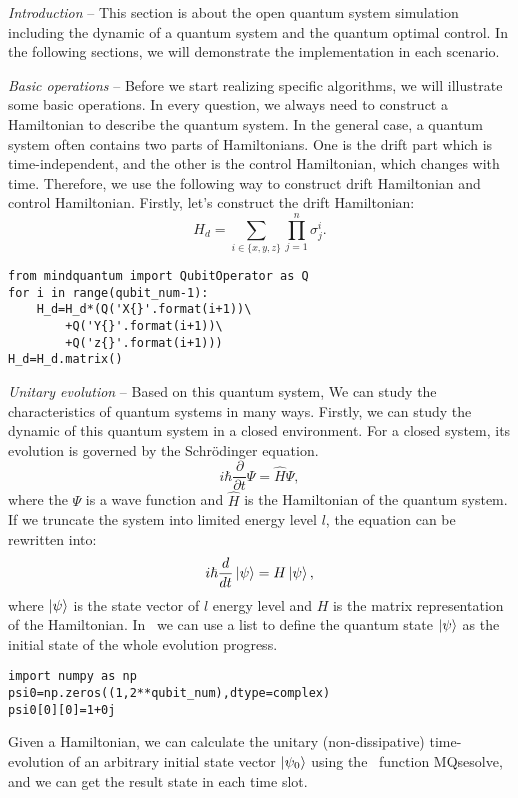 \textit{Introduction} -- This section is about the open quantum system simulation including the dynamic of a quantum system and the quantum optimal control. In the following sections, we will demonstrate the implementation in each scenario.

\textit{Basic operations} -- Before we start realizing specific algorithms, we will illustrate some basic operations. In every question, we always need to construct a Hamiltonian to describe the quantum system. In the general case, a quantum system often contains two parts of Hamiltonians. One is the drift part which is time-independent, and the other is the control Hamiltonian, which changes with time. Therefore, we use the following way to construct drift Hamiltonian and control Hamiltonian. Firstly, let's construct the drift Hamiltonian:
\begin{equation}
    H_{d}=\sum_{i\in\{x,y,z\}}\prod_{j=1}^{n}\sigma_{j}^{i}.
\end{equation}
\begin{lstlisting}
from mindquantum import QubitOperator as Q
for i in range(qubit_num-1):
    H_d=H_d*(Q('X{}'.format(i+1))\
        +Q('Y{}'.format(i+1))\
        +Q('z{}'.format(i+1)))
H_d=H_d.matrix()
\end{lstlisting}
\textit{Unitary evolution} -- Based on this quantum system, We can study the characteristics of quantum systems in many ways. Firstly, we can study the dynamic of this quantum system in a closed environment. For a closed system, its evolution is governed by the Schr\"{o}dinger equation.
\begin{equation}
    i\hbar\frac{\partial}{\partial t}\Psi=\hat{H}\Psi,
\end{equation}
where the $\Psi$ is a wave function and $\hat{H}$ is the Hamiltonian of the quantum system. If we truncate the system into limited energy level $l$, the equation can be rewritten into:
\begin{equation}
    i\hbar\frac{d}{dt}\ket{\psi}=H\ket{\psi},
    \label{shro}
\end{equation}
where $\ket{\psi}$ is the state vector of $l$ energy level and $H$ is the matrix representation of the Hamiltonian. In \MindQuantum\ we can use a list to define the quantum state $\ket{\psi}$ as the initial state of the whole evolution progress.
\begin{lstlisting}
import numpy as np
psi0=np.zeros((1,2**qubit_num),dtype=complex)
psi0[0][0]=1+0j
\end{lstlisting}
Given a Hamiltonian, we can calculate the unitary (non-dissipative) time-evolution of an arbitrary initial state vector $\ket{\psi_{0}}$ using the \MindQuantum\ function MQsesolve, and we can get the result state in each time slot.
